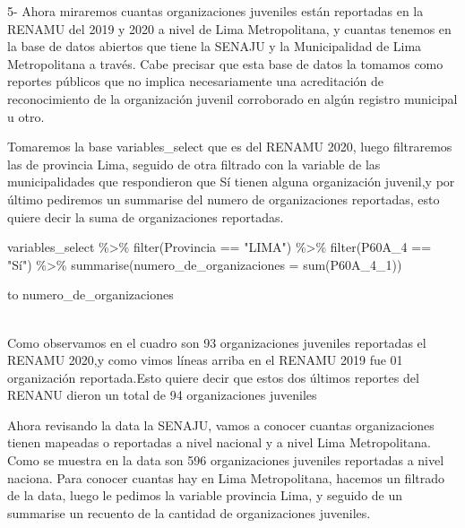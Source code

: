 \documentclass[
]{book}
\newenvironment{Shaded}{\begin{snugshade}}{\end{snugshade}}
\newcommand{\AttributeTok}[1]{\textcolor[rgb]{0.77,0.63,0.00}{#1}}
\newcommand{\FunctionTok}[1]{\textcolor[rgb]{0.00,0.00,0.00}{#1}}
\newcommand{\NormalTok}[1]{#1}
\newcommand{\SpecialCharTok}[1]{\textcolor[rgb]{0.00,0.00,0.00}{#1}}
\newcommand{\StringTok}[1]{\textcolor[rgb]{0.31,0.60,0.02}{#1}}
\begin{document}
5- Ahora miraremos cuantas organizaciones juveniles están reportadas en la RENAMU del 2019 y 2020 a nivel de Lima Metropolitana, y cuantas tenemos en la base de datos abiertos que tiene la SENAJU y la Municipalidad de Lima Metropolitana a través. Cabe precisar que esta base de datos la tomamos como reportes públicos que no implica necesariamente una acreditación de reconocimiento de la organización juvenil corroborado en algún registro municipal u otro.

Tomaremos la base variables\_select que es del RENAMU 2020, luego filtraremos las de provincia Lima, seguido de otra filtrado con la variable de las municipalidades que respondieron que Sí tienen alguna organización juvenil,y por último pediremos un summarise del numero de organizaciones reportadas, esto quiere decir la suma de organizaciones reportadas.

\begin{Shaded}
\begin{Highlighting}[]
\NormalTok{variables\_select }\SpecialCharTok{\%\textgreater{}\%}
  \FunctionTok{filter}\NormalTok{(Provincia }\SpecialCharTok{==} \StringTok{"LIMA"}\NormalTok{) }\SpecialCharTok{\%\textgreater{}\%}
  \FunctionTok{filter}\NormalTok{(P60A\_4 }\SpecialCharTok{==} \StringTok{"Sí"}\NormalTok{) }\SpecialCharTok{\%\textgreater{}\%}
  \FunctionTok{summarise}\NormalTok{(}\AttributeTok{numero\_de\_organizaciones =} \FunctionTok{sum}\NormalTok{(P60A\_4\_1))}
\end{Highlighting}
\end{Shaded}

\begin{table}

\caption{\label{tab:unnamed-chunk-90}}
\centering
\begin{tabu}[c] to 
\hline
numero\_de\_organizaciones\\
\\
\hline
\end{tabu}
\end{table}

Como observamos en el cuadro son 93 organizaciones juveniles reportadas el RENAMU 2020,y como vimos líneas arriba en el RENAMU 2019 fue 01 organización reportada.Esto quiere decir que estos dos últimos reportes del RENANU dieron un total de 94 organizaciones juveniles

Ahora revisando la data la SENAJU, vamos a conocer cuantas organizaciones tienen mapeadas o reportadas a nivel nacional y a nivel Lima Metropolitana. Como se muestra en la data son 596 organizaciones juveniles reportadas a nivel naciona. Para conocer cuantas hay en Lima Metropolitana, hacemos un filtrado de la data, luego le pedimos la variable provincia Lima, y seguido de un summarise un recuento de la cantidad de organizaciones juveniles.
\end{document}
